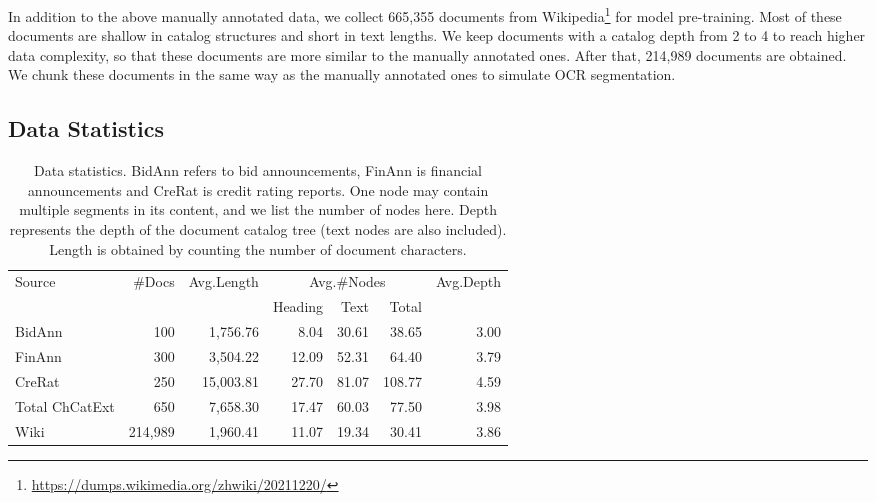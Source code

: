 \documentclass[runningheads]{llncs}
\begin{document}
In addition to the above manually annotated data, we collect 665,355 documents from Wikipedia\footnote{\url{https://dumps.wikimedia.org/zhwiki/20211220/}} for model pre-training.
Most of these documents are shallow in catalog structures and short in text lengths.
We keep documents with a catalog depth from 2 to 4 to reach higher data complexity, so that these documents are more similar to the manually annotated ones.
After that, 214,989 documents are obtained.
We chunk these documents in the same way as the manually annotated ones to simulate OCR segmentation.

\subsection{Data Statistics}\label{sec:data_statistics}

\begin{table}[t]
    \centering
    \caption{Data statistics. BidAnn refers to bid announcements, FinAnn is financial announcements and CreRat is credit rating reports. One node may contain multiple segments in its content, and we list the number of nodes here. Depth represents the depth of the document catalog tree (text nodes are also included). Length is obtained by counting the number of document characters.}
    \begin{tabular}{l|r|r|r|r|r|r}
        \hline
        \multirow{2}{*}{Source} & \multirow{2}{*}{\#Docs} & \multirow{2}{*}{Avg.Length} & \multicolumn{3}{|c|}{Avg.\#Nodes} & \multirow{2}{*}{Avg.Depth} \\
        \cline{4-6}
         & & & Heading & Text & Total & \\
         \hline
         BidAnn & 100 & 1,756.76 & 8.04 & 30.61 & 38.65 & 3.00 \\
         FinAnn & 300 & 3,504.22 & 12.09 & 52.31 & 64.40 & 3.79 \\
         CreRat & 250 & 15,003.81 & 27.70 & 81.07 & 108.77 & 4.59 \\
         \hline
         Total ChCatExt & 650 & 7,658.30 & 17.47 & 60.03 & 77.50 & 3.98 \\
         \hline
         Wiki & 214,989 & 1,960.41 & 11.07 & 19.34 & 30.41 & 3.86 \\
\hline
    \end{tabular}
    \label{tab:data_statistics}
\end{table}
\end{document}
